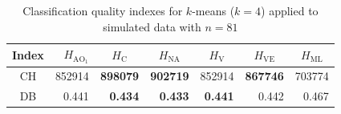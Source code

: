 \documentclass[journal]{IEEEtran}
\begin{document}
\begin{table}[htbp]
	\centering
	\caption{Classification quality indexes for $k$-means ($k=4$) applied to simulated data with $n=81$}
	\label{tab:CHyDB_synt}
	\begin{tabular}{crrrrrr}
		\midrule
		Index   & $H_{{\text{AO}}_1}$ & \multicolumn{1}{c}{$H_\text{C}$} & \multicolumn{1}{c}{$H_{\text{NA}}$} & \multicolumn{1}{c}{$H_\text{V}$} & \multicolumn{1}{c}{$H_{\text{VE}}$} & \multicolumn{1}{c}{$H_{\text{ML}}$} \\
		\midrule
		CH	&	852914	&	\textbf{898079}	&	\textbf{902719}	&	852914	&	\textbf{867746}	&	703774	\\
		DB	&	0.441	&	\textbf{0.434}	&	\textbf{0.433}	&	\textbf{0.441}	&	0.442	&	0.467	\\
		
		\midrule
		
	\end{tabular}%
	\label{tab:addlabel}
\end{table}%
\end{document}
